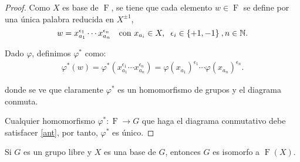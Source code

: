 \begin{proof}



Como $X$ es base de $\operatorname{F}$, se tiene que cada elemento $w\in \operatorname{F}$ se define por una única palabra reducida en $X^{\pm 1}$,
\[
 w=x_{a_1}^{\epsilon_1} \cdots x_{a_n}^{\epsilon_n} \quad \text{con } x_{a_i} \in X, \hspace{0.2cm} \epsilon_i \in \{+ 1, -1\} \:, n \in \mathbb{N} .
\]

Dado $\varphi$, definimos $\varphi^*$ como:
\begin{align} \label{ant}
    \varphi^*(w) = \varphi^*(x_{a_1}^{\epsilon_1} \cdots x_{a_n}^{\epsilon_n}) = \varphi(x_{a_1})^{\epsilon_1} \cdots \varphi(x_{a_n})^{\epsilon_n}.
\end{align}


donde se ve que claramente $\varphi^*$ es un homomorfismo de grupos y el diagrama conmuta.

Cualquier homomorfismo $\varphi^* \colon \operatorname{F} \rightarrow G$ que haga el diagrama conmutativo debe satisfacer \eqref{ant}, por tanto, $\varphi^*$ es único.
\end{proof}












\begin{theorem}[Unicidad]
 Si $G$ es un grupo libre y $X$ es una base de $G$, entonces $G$ es isomorfo a $\operatorname{F}(X)$.
\end{theorem}

